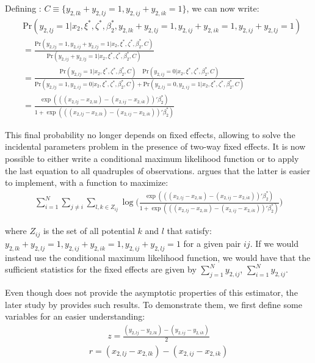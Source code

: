 Defining : $C \equiv \{ y_{2,lk} + y_{2,lj} = 1, y_{2,ij} + y_{2,ik} = 1 \}$, we can now write:
\begin{align} \label{charbonneau_final}
    &\text{Pr}(y_{2,lj} = 1 \rvert x_2, \xi^*, \zeta^*, \beta_2^*, y_{2,lk} + y_{2,lj} = 1, y_{2,ij} + y_{2,ik} = 1, y_{2,ij} + y_{2,lj} = 1) \\
    &=\frac{\text{Pr} (y_{2,lj} = 1, y_{2,ij} + y_{2,lj} = 1 \rvert  x_2, \xi^*, \zeta^*, \beta_2^*, C)}{\text{Pr}(y_{2,ij} + y_{2,lj} = 1 \rvert  x_2, \xi^*, \zeta^*, \beta_2^*, C)} \nonumber\\
    &= \frac{\text{Pr}(y_{2,lj} = 1 \rvert  x_2, \xi^*, \zeta^*, \beta_2^*, C) \quad \text{Pr}(y_{2,ij} = 0 \rvert  x_2, \xi^*, \zeta^*, \beta_2^*, C)} {\text{Pr}(y_{2,lj} = 1, y_{2,ij} = 0 \rvert  x_2, \xi^*, \zeta^*, \beta_2^*, C) + \text{Pr}(y_{2,lj} = 0, y_{2,ij} = 1 \rvert  x_2, \xi^*, \zeta^*, \beta_2^*, C)} \nonumber\\
    &= \frac{\exp(((x_{2,lj} - x_{2,lk}) - (x_{2,ij} - x_{2,ik}))'\beta_2^*)}{1+ \exp(((x_{2,lj} - x_{2,lk}) - (x_{2,ij} - x_{2,ik}))'\beta_2^*)} \nonumber
\end{align}

This final probability no longer depends on fixed effects, allowing to solve the incidental parameters problem in the presence of two-way fixed effects. It is now possible to either write a conditional maximum likelihood function or to apply the last equation to all quadruples of observations. \cite{charbonneau2017multiple} argues that the latter is easier to implement, with a function to maximize:
\begin{align} \label{max_charb}
    \sum_{i=1}^N \sum_{j \neq i} \sum_{l,k \in Z_{ij}} \log \Big( \frac{\exp(((x_{2,lj} - x_{2,lk}) - (x_{2,ij} - x_{2,ik}))'\beta_2^*)}{1+ \exp(((x_{2,lj} - x_{2,lk}) - (x_{2,ij} - x_{2,ik}))'\beta_2^*)} \Big)
\end{align}

\noindent where $Z_{ij}$ is the set of all potential $k$ and $l$ that satisfy: $ y_{2,lk} + y_{2,lj} = 1, y_{2,ij} + y_{2,ik} = 1, y_{2,ij} + y_{2,lj} = 1$ for a given pair $ij$. If we would instead use the conditional maximum likelihood function, we would have that the sufficient statistics for the fixed effects are given by $\sum_{j=1}^N y_{2,ij}$, $\sum_{i=1}^N y_{2,ij}$. 

Even though \cite{charbonneau2017multiple} does not provide the asymptotic properties of this estimator, the later study by \cite{jochmans2018semiparametric} provides such results. To demonstrate them, we first define some variables for an easier understanding:
\begin{align*}
    z = \frac{(y_{2,lj} - y_{2,lk}) - (y_{2,ij} - y_{2,ik})}{2}
\end{align*}
\begin{align*}
    r = (x_{2,lj} - x_{2,lk}) - (x_{2,ij} - x_{2,ik})
\end{align*}

